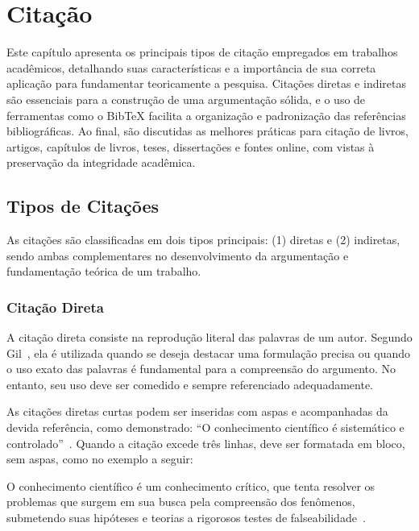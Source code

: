 
\chapter{Citação}
\label{cap:citacao}

Este capítulo apresenta os principais tipos de citação empregados em trabalhos acadêmicos, detalhando suas características e a importância de sua correta aplicação para fundamentar teoricamente a pesquisa. Citações diretas e indiretas são essenciais para a construção de uma argumentação sólida, e o uso de ferramentas como o BibTeX facilita a organização e padronização das referências bibliográficas. Ao final, são discutidas as melhores práticas para citação de livros, artigos, capítulos de livros, teses, dissertações e fontes online, com vistas à preservação da integridade acadêmica.

\section{Tipos de Citações}

As citações são classificadas em dois tipos principais: (1) diretas e (2) indiretas, sendo ambas complementares no desenvolvimento da argumentação e fundamentação teórica de um trabalho.

\subsection{Citação Direta}

A citação direta consiste na reprodução literal das palavras de um autor. Segundo Gil~\cite{gil}, ela é utilizada quando se deseja destacar uma formulação precisa ou quando o uso exato das palavras é fundamental para a compreensão do argumento. No entanto, seu uso deve ser comedido e sempre referenciado adequadamente.

As citações diretas curtas podem ser inseridas com aspas e acompanhadas da devida referência, como demonstrado: ``O conhecimento científico é sistemático e controlado''~\cite{gil}. Quando a citação excede três linhas, deve ser formatada em bloco, sem aspas, como no exemplo a seguir:

\begin{citacao}
    O conhecimento científico é um conhecimento crítico, que tenta resolver os problemas que surgem em sua busca pela compreensão dos fenômenos, submetendo suas hipóteses e teorias a rigorosos testes de falseabilidade~\cite{gil}.
\end{citacao}

